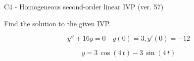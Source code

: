 \begin{exercise}
  \begin{exerciseTitle}C4 - Homogeneous second-order linear IVP (ver. 57)\end{exerciseTitle}
  \begin{exerciseStatement}
    
Find the solution to the given IVP.

    
\[y''+16y = 0 \hspace{1em} y(0) = 3 , y'(0) = -12\]

  \end{exerciseStatement}
  \begin{exerciseAnswer}
    
\[y= 3 \, \cos\left(4 \, t\right) - 3 \, \sin\left(4 \, t\right)\]

  \end{exerciseAnswer}
\end{exercise}
